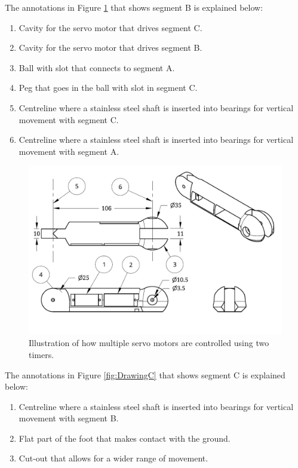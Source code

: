 The annotations in Figure \ref{fig:DrawingB} that shows segment B is explained below:
\begin{enumerate}
\item Cavity for the servo motor that drives segment C.
\item Cavity for the servo motor that drives segment B.
\item Ball with slot that connects to segment A.
\item Peg that goes in the ball with slot in segment C.
\item Centreline where a stainless steel shaft is inserted into bearings for vertical movement with segment C.
\item Centreline where a stainless steel shaft is inserted into bearings for vertical movement with segment A.
\end{enumerate}

\begin{figure}[H]
\centering
\includegraphics[scale = 0.8]{pics/DrawingB.pdf}
\caption{Illustration of how multiple servo motors are controlled using two timers.}
\label{fig:DrawingB}
\end{figure}

The annotations in Figure \ref{fig:DrawingC} that shows segment C is explained below:
\begin{enumerate}
\item Centreline where a stainless steel shaft is inserted into bearings for vertical movement with segment B.
\item Flat part of the foot that makes contact with the ground.
\item Cut-out that allows for a wider range of movement.
\end{enumerate}

